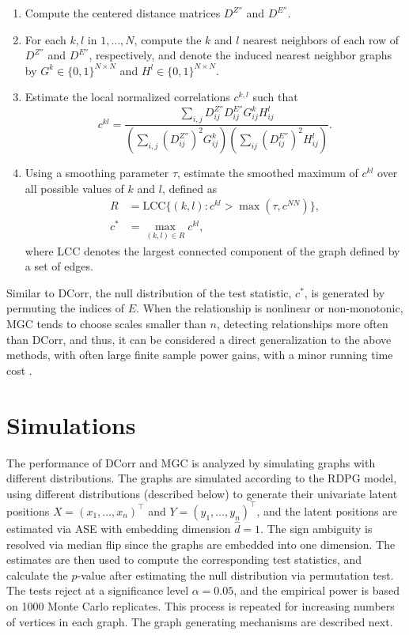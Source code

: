\begin{enumerate}
	\item Compute the centered distance matrices $D^{Z''}$ and $D^{E''}$.
	\item For each $k,l$ in $1,\ldots, N$, compute the $k$ and $l$ nearest neighbors of each row of $D^{Z''}$ and $D^{E''}$, respectively, and denote the induced nearest neighbor graphs by $G^k\in\{0,1\}^{N\times N}$ and $H^l\in\{0,1\}^{N\times N}$.
	\item Estimate the local normalized correlations $c^{k,l}$ such that
	\begin{equation*}
	c^{kl} = \frac{\sum_{i,j}D^{Z''}_{ij}D^{E''}_{ij}G^k_{ij}H^{l}_{ij}}{\left(\sum_{i,j}(D^{Z''}_{ij})^2G^k_{ij}\right) \left(\sum_{ij}(D^{E''}_{ij})^2H^{l}_{ij}\right)}.
	\end{equation*}
	\item Using a smoothing parameter $\tau$, estimate the smoothed maximum of $c^{kl}$ over all possible values of $k$ and $l$, defined as
	\begin{align*}
	R &= \text{LCC}\{(k,l):c^{kl}>\max(\tau,c^{NN})\},\\
    c^\ast &= \max_{(k,l)\in R}c^{kl},
	\end{align*}
	where LCC denotes the largest connected component of the graph defined by a set of edges.
\end{enumerate} 

Similar to DCorr, the null distribution of the test statistic, $c^\ast$, is generated by permuting the indices of $E$.
When the relationship is nonlinear or non-monotonic, MGC tends to choose scales smaller than $n$, detecting relationships more often than DCorr, and thus, it can be considered a direct generalization to the above methods, with often large finite sample power gains, with a minor running time cost \cite{mgc-0}.

\section{Simulations}\label{sec:simulations}

The performance of DCorr and MGC is analyzed by simulating graphs with different distributions. The graphs are simulated according to the RDPG model, using different distributions (described below) to generate their univariate latent positions $X=(x_1,\ldots, x_n)^\top$ and $Y=(y_1,\ldots, y_n)^\top$, and the latent positions are estimated via ASE with embedding dimension $\hat d= 1$. 
The sign ambiguity is resolved via median flip since the graphs are embedded into one dimension. The estimates are then used to compute the corresponding test statistics, and calculate the $p$-value after estimating the null distribution via permutation test. The tests reject at a significance level $\alpha=0.05$, and the empirical power is based on 1000 Monte Carlo replicates. This process is repeated for increasing numbers of vertices in each graph. The graph generating mechanisms are described next.

